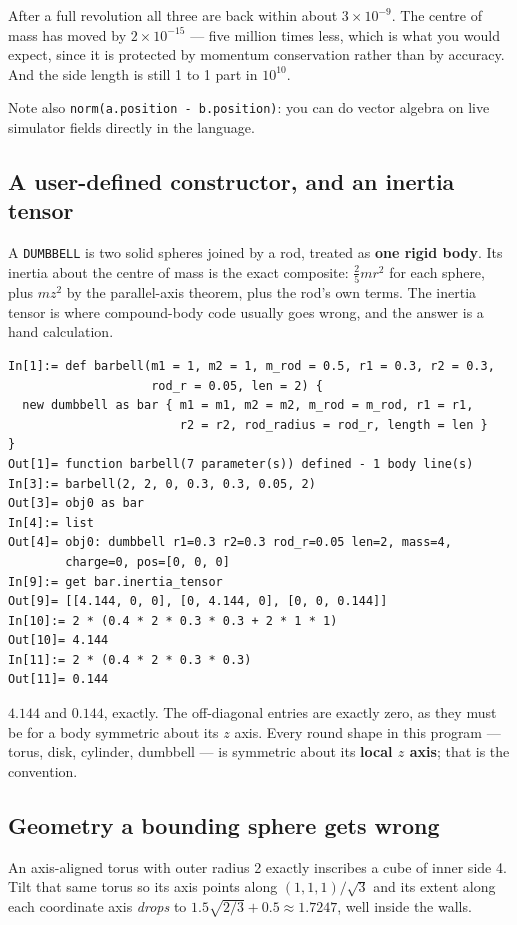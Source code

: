 \documentclass[11pt]{article}
\newcommand{\kw}[1]{\texttt{\uppercase{#1}}}
\newcommand{\code}[1]{\texttt{#1}}
\begin{document}
After a full revolution all three are back within about
$3\times10^{-9}$. The centre of mass has moved by $2\times10^{-15}$ ---
five million times less, which is what you would expect, since it is
protected by momentum conservation rather than by accuracy. And the side
length is still 1 to 1 part in $10^{10}$.

Note also \code{norm(a.position - b.position)}: you can do vector
algebra on live simulator fields directly in the language.

\subsection{A user-defined constructor, and an inertia tensor}

A \kw{dumbbell} is two solid spheres joined by a rod, treated as
\textbf{one rigid body}. Its inertia about the centre of mass is the
exact composite: $\tfrac25 mr^2$ for each sphere, plus $mz^2$ by the
parallel-axis theorem, plus the rod's own terms. The inertia tensor is
where compound-body code usually goes wrong, and the answer is a hand
calculation.

\begin{lstlisting}
In[1]:= def barbell(m1 = 1, m2 = 1, m_rod = 0.5, r1 = 0.3, r2 = 0.3,
                    rod_r = 0.05, len = 2) {
  new dumbbell as bar { m1 = m1, m2 = m2, m_rod = m_rod, r1 = r1,
                        r2 = r2, rod_radius = rod_r, length = len }
}
Out[1]= function barbell(7 parameter(s)) defined - 1 body line(s)
In[3]:= barbell(2, 2, 0, 0.3, 0.3, 0.05, 2)
Out[3]= obj0 as bar
In[4]:= list
Out[4]= obj0: dumbbell r1=0.3 r2=0.3 rod_r=0.05 len=2, mass=4,
        charge=0, pos=[0, 0, 0]
In[9]:= get bar.inertia_tensor
Out[9]= [[4.144, 0, 0], [0, 4.144, 0], [0, 0, 0.144]]
In[10]:= 2 * (0.4 * 2 * 0.3 * 0.3 + 2 * 1 * 1)
Out[10]= 4.144
In[11]:= 2 * (0.4 * 2 * 0.3 * 0.3)
Out[11]= 0.144
\end{lstlisting}

$4.144$ and $0.144$, exactly. The off-diagonal entries are exactly zero,
as they must be for a body symmetric about its $z$ axis. Every round
shape in this program --- torus, disk, cylinder, dumbbell --- is
symmetric about its \textbf{local $z$ axis}; that is the convention.

\subsection{Geometry a bounding sphere gets wrong}

An axis-aligned torus with outer radius 2 exactly inscribes a cube of
inner side 4. Tilt that same torus so its axis points along
$(1,1,1)/\sqrt3$ and its extent along each coordinate axis \emph{drops}
to $1.5\sqrt{2/3} + 0.5 \approx 1.7247$, well inside the walls.
\end{document}
